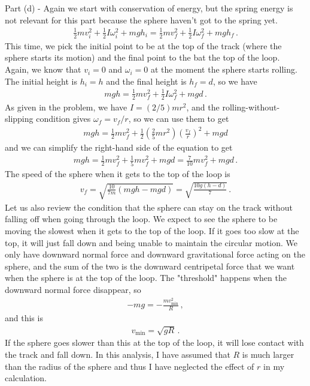 \documentclass[11pt]{article}
\begin{document}
\noindent Part (d) - Again we start with conservation of energy, but the spring energy is not relevant for this part because the sphere haven't got to the spring yet. 
\begin{align*}
\frac{1}{2}mv_i^2 + \frac{1}{2}I\omega_i^2 + mgh_i =
\frac{1}{2}mv_f^2 + \frac{1}{2}I\omega_f^2 + mgh_f\,.
\end{align*}
This time, we pick the initial point to be at the top of the track (where the sphere starts its motion) and the final point to the bat the top of the loop. Again, we know that $v_i = 0$ and $\omega_i = 0$ at the moment the sphere starts rolling. The initial height is $h_i = h$ and the final height is $h_f = d$, so we have
\begin{align*}
mgh = \frac{1}{2}mv_f^2 + \frac{1}{2}I\omega_f^2 + mgd\,.
\end{align*}
As given in the problem, we have $I = (2/5) mr^2$, and the rolling-without-slipping condition gives $\omega_f = v_f/r$, so we can use them to get
\begin{align*}
mgh =
\frac{1}{2}mv_f^2 + \frac{1}{2}\left(\frac{2}{5}mr^2 \right)\left(\frac{v_f}{r}\right)^2 + mgd
\end{align*}
and we can simplify the right-hand side of the equation to get
\begin{align*}
mgh = \frac{1}{2}mv_f^2 + \frac{1}{5}m v_f^2 + mgd = \frac{7}{10}mv_f^2 + mgd\,.
\end{align*}
The speed of the sphere when it gets to the top of the loop is 
\begin{align*}
v_f =\sqrt{\frac{10}{7m} ( mgh-mgd)} = \sqrt{\frac{10 g (h-d)}{7}}\,.
\end{align*}
Let us also review the condition that the sphere can stay on the track without falling off when going through the loop. We expect to see the sphere to be moving the slowest when it gets to the top of the loop. If it goes too slow at the top, it will just fall down and being unable to maintain the circular motion. We only have downward normal force and downward gravitational force acting on the sphere, and the sum of the two is the downward centripetal force that we want when the sphere is at the top of the loop. The "threshold" happens when the downward normal force disappear, so 
\begin{align*}
-mg = -\frac{mv_{\min}^2}{R}\,,
\end{align*}
and this is 
\begin{align*}
v_{\min} = \sqrt{gR}\,.
\end{align*}
If the sphere goes slower than this at the top of the loop, it will lose contact with the track and fall down. In this analysis, I have assumed that $R$ is much larger than the radius of the sphere and thus I have neglected the effect of $r$ in my calculation.\\
\end{document}
